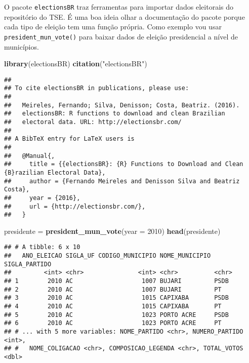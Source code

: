 \documentclass[]{article}
\newenvironment{Shaded}{\begin{snugshade}}{\end{snugshade}}
\newcommand{\KeywordTok}[1]{\textcolor[rgb]{0.13,0.29,0.53}{\textbf{#1}}}
\newcommand{\DataTypeTok}[1]{\textcolor[rgb]{0.13,0.29,0.53}{#1}}
\newcommand{\DecValTok}[1]{\textcolor[rgb]{0.00,0.00,0.81}{#1}}
\newcommand{\StringTok}[1]{\textcolor[rgb]{0.31,0.60,0.02}{#1}}
\newcommand{\NormalTok}[1]{#1}
\begin{document}
O pacote \texttt{electionsBR} traz ferramentas para importar dados
eleitorais do repositório do TSE. É uma boa ideia olhar a documentação
do pacote porque cada tipo de eleição tem uma função própria. Como
exemplo vou usar \texttt{president\_mun\_vote()} para baixar dados de
eleição presidencial a nível de municípios.

\begin{Shaded}
\begin{Highlighting}[]
\KeywordTok{library}\NormalTok{(electionsBR)}
\KeywordTok{citation}\NormalTok{(}\StringTok{"electionsBR"}\NormalTok{)}
\end{Highlighting}
\end{Shaded}

\begin{verbatim}
## 
## To cite electionsBR in publications, please use:
## 
##   Meireles, Fernando; Silva, Denisson; Costa, Beatriz. (2016).
##   electionsBR: R functions to download and clean Brazilian
##   electoral data. URL: http://electionsbr.com/
## 
## A BibTeX entry for LaTeX users is
## 
##   @Manual{,
##     title = {{electionsBR}: {R} Functions to Download and Clean {B}razilian Electoral Data},
##     author = {Fernando Meireles and Denisson Silva and Beatriz Costa},
##     year = {2016},
##     url = {http://electionsbr.com/},
##   }
\end{verbatim}

\begin{Shaded}
\begin{Highlighting}[]
\NormalTok{presidente =}\StringTok{ }\KeywordTok{president_mun_vote}\NormalTok{(}\DataTypeTok{year =} \DecValTok{2010}\NormalTok{)}
\KeywordTok{head}\NormalTok{(presidente)}
\end{Highlighting}
\end{Shaded}

\begin{verbatim}
## # A tibble: 6 x 10
##   ANO_ELEICAO SIGLA_UF CODIGO_MUNICIPIO NOME_MUNICIPIO SIGLA_PARTIDO
##         <int> <chr>               <int> <chr>          <chr>        
## 1        2010 AC                   1007 BUJARI         PSDB         
## 2        2010 AC                   1007 BUJARI         PT           
## 3        2010 AC                   1015 CAPIXABA       PSDB         
## 4        2010 AC                   1015 CAPIXABA       PT           
## 5        2010 AC                   1023 PORTO ACRE     PSDB         
## 6        2010 AC                   1023 PORTO ACRE     PT           
## # ... with 5 more variables: NOME_PARTIDO <chr>, NUMERO_PARTIDO <int>,
## #   NOME_COLIGACAO <chr>, COMPOSICAO_LEGENDA <chr>, TOTAL_VOTOS <dbl>
\end{verbatim}
\end{document}
